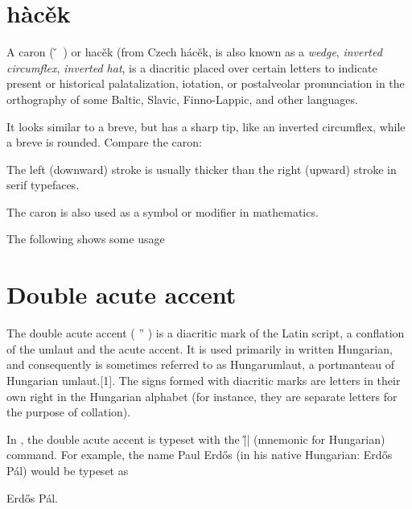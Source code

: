 \section{h\protect\`ac\protect\v{e}k}

A caron ( \v  ~) or hac\v{e}k  (from Czech h\' ac\v{e}k, is also known as a \textit{wedge}, \textit{inverted circumflex}, \textit{inverted hat}, is a diacritic placed over certain letters to indicate present or historical palatalization, iotation, or postalveolar pronunciation in the orthography of some Baltic, Slavic, Finno-Lappic, and other languages.

It looks similar to a breve, but has a sharp tip, like an inverted circumflex, while a breve is rounded. Compare the caron: 

The left (downward) stroke is usually thicker than the right (upward) stroke in serif typefaces.

The caron is also used as a symbol or modifier in mathematics.

\bigskip
\begin{center}     \end{center}
\bigskip

The following shows some usage
\bigskip


\bigskip



\section*{Double acute accent}
\begin{multicols}{2}
The double acute accent ( '' ) is a diacritic mark of the Latin script, a conflation of the umlaut and the acute accent. It is used primarily in written Hungarian, and consequently is sometimes referred to as Hungarumlaut, a portmanteau of Hungarian umlaut.[1]. The signs formed with diacritic marks are letters in their own right in the Hungarian alphabet (for instance, they are separate letters for the purpose of collation).


In \alltex, the double acute accent is typeset with the |\H{}| (mnemonic for Hungarian) command. For example, the name Paul Erd\H{o}s (in his native Hungarian: Erd\H{o}s P\'al) would be typeset as
\end{multicols}
\begin{Code}
Erd\H{o}s P\'al.
\end{Code}

